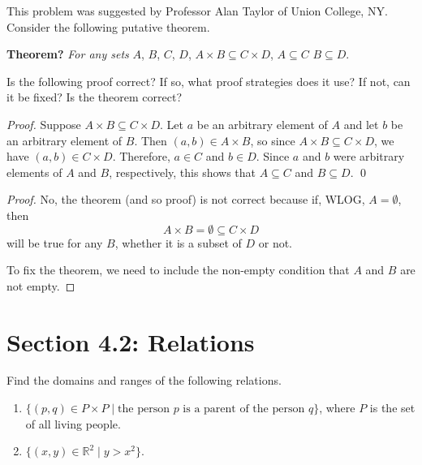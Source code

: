 \documentclass[12pt]{article}
\newenvironment{exercise}[2][Exercise]{\begin{trivlist}
\item[\hskip \labelsep {\bfseries #1}\hskip \labelsep {\bfseries #2.}]}{\end{trivlist}}
\begin{document}
\begin{exercise}
	{15}
	This problem was suggested by Professor Alan Taylor of Union College, NY. Consider the following putative theorem.

	\textbf{Theorem?} \textit{For any sets } \( A \), \( B \), \( C \),  \( D \),  \( A \times B \subseteq C \times D \),  \( A \subseteq C \)  \( B \subseteq D \).

	Is the following proof correct? If so, what proof strategies does it use? If not, can it be fixed? Is the theorem correct?

	\textit{Proof.} Suppose \( A \times B \subseteq C \times D \). Let \( a \) be an arbitrary element of \( A \) and let \( b \) be an arbitrary element of \( B \). Then \( (a, b) \in A \times B \), so since \( A \times B \subseteq C \times D \), we have \( (a, b) \in C \times D \). Therefore, \( a \in C \) and \( b \in D \). Since \( a \) and \( b \) were arbitrary elements of \( A \) and \( B \), respectively, this shows that \( A \subseteq C \) and \( B \subseteq D \). \qed
\end{exercise}

\begin{proof}
	No, the theorem (and so proof) is not correct because if, WLOG, \( A = \emptyset \), then
	\[
		A \times B = \emptyset \subseteq C \times D
	\]
	will be true for any \( B \), whether it is a subset of \( D \) or not.

	To fix the theorem, we need to include the non-empty condition that \( A \) and \( B \) are not empty.
\end{proof}

\section{Section 4.2: Relations}

\begin{exercise}
	{1}
	Find the domains and ranges of the following relations.
	\begin{enumerate}
		\item[(a)] \( \{(p, q) \in P \times P \mid \text{the person } p \text{ is a parent of the person } q\} \), where \( P \) is the set of all living people.

		\item[(b)] \( \{(x, y) \in \mathbb{R}^2 \mid y > x^2\} \).
	\end{enumerate}

\end{exercise}
\end{document}
